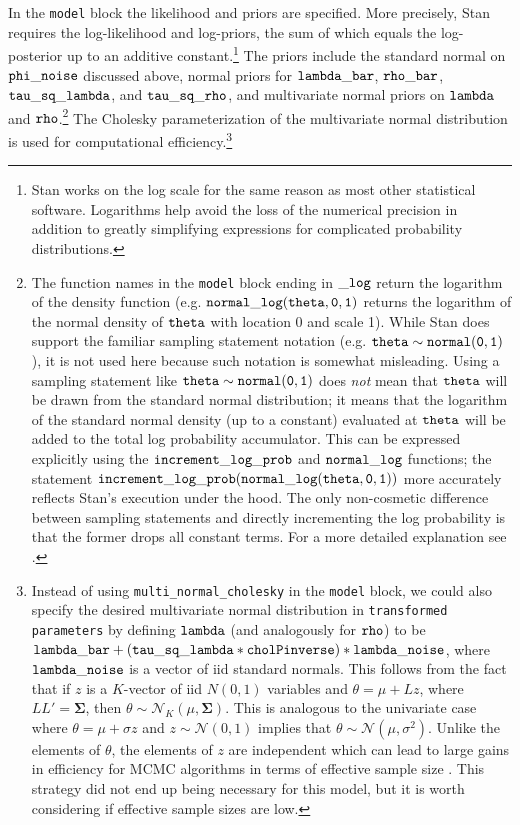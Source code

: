 In the {\tt model} block the likelihood and priors are specified. More precisely, Stan requires the log-likelihood and log-priors, the sum of which equals the log-posterior up to an additive constant.\footnote{Stan works on the log scale for the same reason as most other statistical software. Logarithms help avoid the loss of the numerical precision in addition to greatly simplifying expressions for complicated probability distributions.}
The priors include the standard normal on ${\tt phi\_noise}$ discussed above, normal priors for ${\tt lambda\_bar}$, ${\tt rho\_bar}$, ${\tt tau\_sq\_lambda}$, and ${\tt tau\_sq\_rho}$, and multivariate normal priors on ${\tt lambda}$ and ${\tt rho}$.\footnote{The function names in the {\tt model} block ending in ${\tt\_log}$ return the logarithm of the density function (e.g. ${\tt normal\_log(theta,0,1)}$ returns the logarithm of the normal density of ${\tt theta}$  with location 0 and scale 1). While Stan does support the familiar sampling statement notation (e.g. ${\tt theta \sim normal(0,1)}$), it is not used here because such notation is somewhat misleading. Using a sampling statement like ${\tt theta \sim normal(0,1)}$ does {\it not} mean that ${\tt theta}$ will be drawn from the standard normal distribution; it means that the logarithm of the standard normal density (up to a constant) evaluated at ${\tt theta}$ will be added to the total log probability accumulator. This can be expressed explicitly using the ${\tt increment\_log\_prob}$ and ${\tt normal\_log}$ functions; the statement ${\tt increment\_log\_prob(normal\_log(theta,0,1))}$ more accurately reflects Stan's execution under the hood. The only non-cosmetic difference between sampling statements and directly incrementing the log probability is that the former drops all constant terms. For a more detailed explanation see .} The Cholesky parameterization of the multivariate normal distribution is used for computational efficiency.\footnote{Instead of using {\tt multi\_normal\_cholesky} in the {\tt model} block, we could also specify the desired multivariate normal distribution in {\tt transformed parameters} by defining ${\tt lambda}$ (and analogously for ${\tt rho}$) to be  ${\tt lambda\_bar + (tau\_sq\_lambda * cholPinverse) * lambda\_noise}$, where ${\tt lambda\_noise}$ is a vector of iid standard normals. This follows from the fact that if $z$ is a $K$-vector of iid $N(0,1)$ variables and $\theta = \mu + L z$, where $LL' = \boldsymbol{\Sigma}$, then $\theta \sim \mathcal{N}_K (\mu, \boldsymbol{\Sigma})$. This is analogous to the univariate case where $\theta = \mu + \sigma z$ and $z \sim \mathcal{N}(0,1)$ implies that $\theta \sim \mathcal{N}(\mu, \sigma^2)$. Unlike the elements of $\theta$, the elements of $z$ are independent which can lead to large gains in efficiency for MCMC algorithms in terms of effective sample size . This strategy did not end up being necessary for this model, but it is worth considering if effective sample sizes are low.} 

